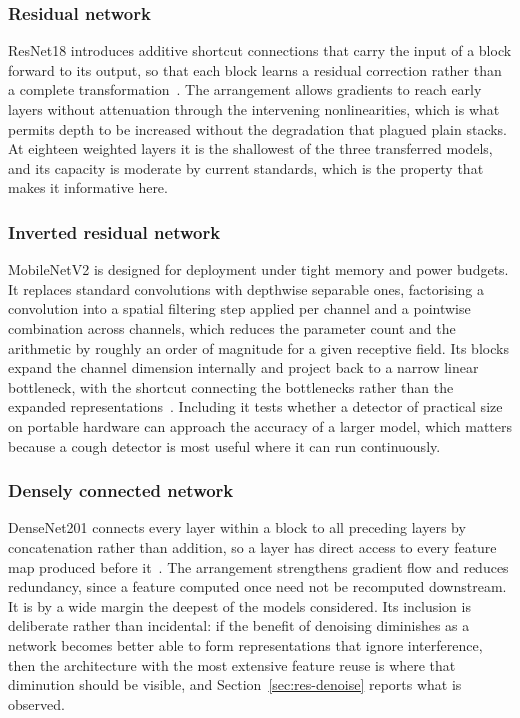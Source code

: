\documentclass[pdflatex,sn-mathphys-num]{sn-jnl}
\begin{document}
\subsubsection{Residual network}\label{sec:d-resnet}

ResNet18 introduces additive shortcut connections that carry the input of a
block forward to its output, so that each block learns a residual correction
rather than a complete transformation~\cite{he2016}. The arrangement allows
gradients to reach early layers without attenuation through the intervening
nonlinearities, which is what permits depth to be increased without the
degradation that plagued plain stacks. At eighteen weighted layers it is the
shallowest of the three transferred models, and its capacity is moderate by
current standards, which is the property that makes it informative here.

\subsubsection{Inverted residual network}\label{sec:d-mobilenet}

MobileNetV2 is designed for deployment under tight memory and power budgets.
It replaces standard convolutions with depthwise separable ones, factorising a
convolution into a spatial filtering step applied per channel and a pointwise
combination across channels, which reduces the parameter count and the
arithmetic by roughly an order of magnitude for a given receptive field. Its
blocks expand the channel dimension internally and project back to a narrow
linear bottleneck, with the shortcut connecting the bottlenecks rather than the
expanded representations~\cite{sandler2018}. Including it tests whether a
detector of practical size on portable hardware can approach the accuracy of a
larger model, which matters because a cough detector is most useful where it
can run continuously.

\subsubsection{Densely connected network}\label{sec:d-densenet}

DenseNet201 connects every layer within a block to all preceding layers by
concatenation rather than addition, so a layer has direct access to every
feature map produced before it~\cite{huang2017}. The arrangement strengthens
gradient flow and reduces redundancy, since a feature computed once need not
be recomputed downstream. It is by a wide margin the deepest of the models
considered. Its inclusion is deliberate rather than incidental: if the benefit
of denoising diminishes as a network becomes better able to form
representations that ignore interference, then the architecture with the most
extensive feature reuse is where that diminution should be visible, and
Section~\ref{sec:res-denoise} reports what is observed.
\end{document}
